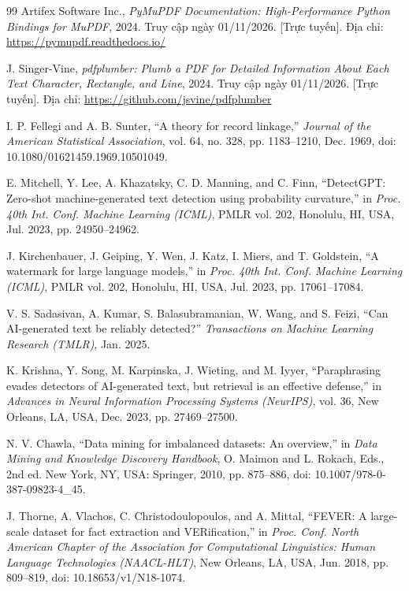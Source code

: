 \begin{thebibliography}{99}
Artifex Software Inc., \textit{PyMuPDF Documentation: High-Performance Python Bindings for MuPDF}, 2024. Truy cập ngày 01/11/2026. [Trực tuyến]. Địa chỉ: \url{https://pymupdf.readthedocs.io/}

J. Singer-Vine, \textit{pdfplumber: Plumb a PDF for Detailed Information About Each Text Character, Rectangle, and Line}, 2024. Truy cập ngày 01/11/2026. [Trực tuyến]. Địa chỉ: \url{https://github.com/jsvine/pdfplumber}

I. P. Fellegi and A. B. Sunter, ``A theory for record linkage,'' \textit{Journal of the American Statistical Association}, vol. 64, no. 328, pp. 1183--1210, Dec. 1969, doi: 10.1080/01621459.1969.10501049.

E. Mitchell, Y. Lee, A. Khazatsky, C. D. Manning, and C. Finn, ``DetectGPT: Zero-shot machine-generated text detection using probability curvature,'' in \textit{Proc. 40th Int. Conf. Machine Learning (ICML)}, PMLR vol. 202, Honolulu, HI, USA, Jul. 2023, pp. 24950--24962.

J. Kirchenbauer, J. Geiping, Y. Wen, J. Katz, I. Miers, and T. Goldstein, ``A watermark for large language models,'' in \textit{Proc. 40th Int. Conf. Machine Learning (ICML)}, PMLR vol. 202, Honolulu, HI, USA, Jul. 2023, pp. 17061--17084.

V. S. Sadasivan, A. Kumar, S. Balasubramanian, W. Wang, and S. Feizi, ``Can AI-generated text be reliably detected?'' \textit{Transactions on Machine Learning Research (TMLR)}, Jan. 2025.

K. Krishna, Y. Song, M. Karpinska, J. Wieting, and M. Iyyer, ``Paraphrasing evades detectors of AI-generated text, but retrieval is an effective defense,'' in \textit{Advances in Neural Information Processing Systems (NeurIPS)}, vol. 36, New Orleans, LA, USA, Dec. 2023, pp. 27469--27500.

N. V. Chawla, ``Data mining for imbalanced datasets: An overview,'' in \textit{Data Mining and Knowledge Discovery Handbook}, O. Maimon and L. Rokach, Eds., 2nd ed. New York, NY, USA: Springer, 2010, pp. 875--886, doi: 10.1007/978-0-387-09823-4\_45.

J. Thorne, A. Vlachos, C. Christodoulopoulos, and A. Mittal, ``FEVER: A large-scale dataset for fact extraction and VERification,'' in \textit{Proc. Conf. North American Chapter of the Association for Computational Linguistics: Human Language Technologies (NAACL-HLT)}, New Orleans, LA, USA, Jun. 2018, pp. 809--819, doi: 10.18653/v1/N18-1074.


\end{thebibliography}
